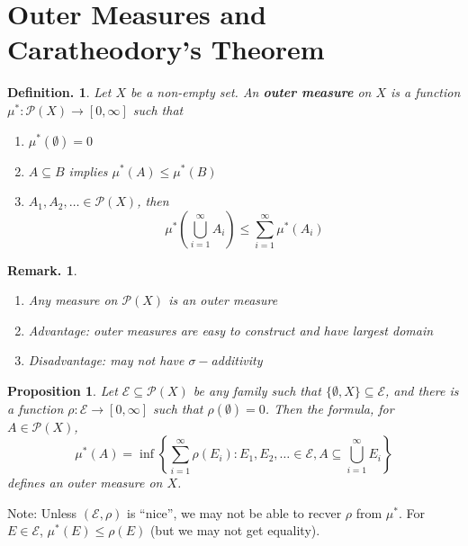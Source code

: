 \documentclass[12pt, a4paper]{memoir}
\newtheorem{proposition}[theorem]{Proposition}
\theoremstyle{nonumberplain}
\newtheorem{definition}{Definition.}
\newtheorem{remark}{Remark.}
\begin{document}
\section{Outer Measures and Caratheodory's Theorem}
\begin{definition}
    Let $X$ be a non-empty set.
    An \textbf{outer measure} on $X$ is a function $\mu^*:\mathcal{P}(X)\to[0,\infty]$ such that
    \begin{enumerate}[nolistsep,label=(\roman*)]
        \item $\mu^*(\emptyset)=0$
        \item $A\subseteq B$ implies $\mu^*(A)\leq\mu^*(B)$
        \item $A_1,A_2,\ldots\in \mathcal{P}(X)$, then
            \begin{equation*}\mu^*\left(\bigcup\limits_{i=1}^\infty A_i\right)\leq\sum\limits_{i=1}^\infty \mu^*(A_i)\end{equation*}
    \end{enumerate}
\end{definition}
\begin{remark}
    \begin{enumerate}[nolistsep,label=(\alph*)]
        \item Any measure on $\mathcal{P}(X)$ is an outer measure
        \item Advantage: outer measures are easy to construct and have largest domain
        \item Disadvantage: may not have $\sigma-$additivity
    \end{enumerate}
\end{remark}
\begin{proposition}
    Let $\mathcal{E}\subseteq\mathcal{P}(X)$ be any family such that $\{\emptyset,X\}\subseteq\mathcal{E}$, and there is a function $\rho:\mathcal{E}\to[0,\infty]$ such that $\rho(\emptyset)=0$.
    Then the formula, for $A\in\mathcal{P}(X)$,
    \begin{equation*}
        \mu^*(A)=\inf\left\{\sum\limits_{i=1}^\infty \rho(E_i):E_1,E_2,\ldots\in\mathcal{E}, A\subseteq\bigcup\limits_{i=1}^\infty E_i\right\}
    \end{equation*}
    defines an outer measure on $X$.
\end{proposition}
Note: Unless $(\mathcal{E},\rho)$ is ``nice'', we may not be able to recver $\rho$ from $\mu^*$.
For $E\in\mathcal{E}$, $\mu^*(E)\leq\rho(E)$ (but we may not get equality).
\end{document}
